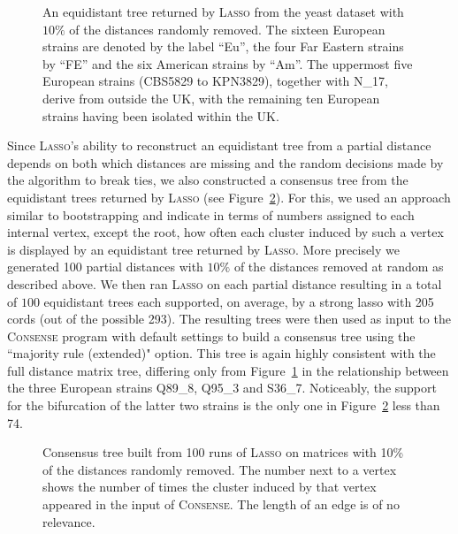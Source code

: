 \begin{figure}[t]
  \tbfigures
  \centering
  \begin{tikzpicture}[xscale=50,yscale=0.35]
    
  \end{tikzpicture}
  \endpgfgraphicnamed
  \caption{An equidistant tree returned by \textsc{Lasso} from the yeast
    dataset with $10\%$ of the distances randomly removed. The sixteen
    European strains are denoted by the label ``Eu'', the four Far Eastern
    strains by ``FE'' and the six American strains by ``Am''. The uppermost
    five European strains (CBS5829 to KPN3829), together with N\_17, derive
    from outside the UK, with the remaining ten European strains having been
    isolated within the UK.}
  \label{fig:yeast-tree-complete}
\end{figure}

Since \textsc{Lasso}'s ability to reconstruct an equidistant tree from a
partial distance depends on both which distances are missing and the random
decisions made by the algorithm to break ties, we also constructed a consensus
tree from the equidistant trees returned by \textsc{Lasso} (see
Figure~\ref{fig:yeast-tree-consense}).  For this, we used an approach similar
to bootstrapping and indicate in terms of numbers assigned to each internal
vertex, except the root, how often each cluster induced by such a vertex is
displayed by an equidistant tree returned by \textsc{Lasso}.  More precisely
we generated 100 partial distances with $10\%$ of the distances removed at
random as described above.  We then ran \textsc{Lasso} on each partial
distance resulting in a total of $100$ equidistant trees each supported, on
average, by a strong lasso with 205 cords (out of the possible 293).  The
resulting trees were then used as input to the \textsc{Consense} program
\cite{felsenstein1993phylip} with default settings to build a consensus tree
using the ``majority rule (extended)" option. This tree is again highly
consistent with the full distance matrix tree, differing only from
Figure~\ref{fig:yeast-tree-complete} in the relationship between the three
European strains Q89\_8, Q95\_3 and S36\_7. Noticeably, the support for the
bifurcation of the latter two strains is the only one in
Figure~\ref{fig:yeast-tree-consense} less than 74.

\begin{figure}[t]
  \tbfigures
  \centering
  \begin{tikzpicture}[xscale=0.8,yscale=0.35]
    
  \end{tikzpicture}
  \endpgfgraphicnamed
  \caption{Consensus tree built from 100 runs of \textsc{Lasso} on matrices
    with 10\% of the distances randomly removed.  The number next to a vertex
    shows the number of times the cluster induced by that vertex appeared in
    the input of \textsc{Consense}. The length of an edge is of no relevance.}
  \label{fig:yeast-tree-consense}
\end{figure}

